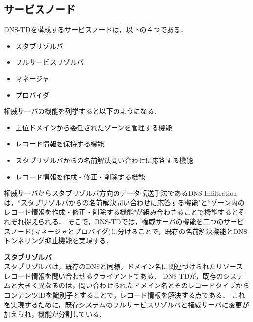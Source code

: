 \subsection{サービスノード}
DNS-TDを構成するサービスノードは，以下の４つである．
\begin{itemize}
 \item スタブリゾルバ
	\vspace{-3mm}
 \item フルサービスリゾルバ
	\vspace{-3mm}
 \item マネージャ
	\vspace{-3mm}
 \item プロバイダ
\end{itemize}

権威サーバの機能を列挙すると以下のようになる．
\begin{itemize}
 \item 上位ドメインから委任されたゾーンを管理する機能
	\vspace{-3mm}
 \item レコード情報を保持する機能
	\vspace{-3mm}
 \item スタブリゾルバからの名前解決問い合わせに応答する機能
	\vspace{-3mm}
 \item レコード情報を作成・修正・削除する機能
\end{itemize}
権威サーバからスタブリゾルバ方向のデータ転送手法であるDNS Infiltrationは，``スタブリゾルバからの名前解決問い合わせに応答する機能"と``ゾーン内のレコード情報を作成・修正・削除する機能"が組み合わさることで機能するとそれぞれ捉えられる．
そこで，DNS-TDでは，権威サーバの機能を二つのサービスノード(マネージャとプロバイダ)に分けることで，既存の名前解決機能とDNSトンネリング抑止機能を実現する．\newline

\hspace{-12pt}\textbf{スタブリゾルバ}\\
\hspace{12pt}スタブリゾルバは，既存のDNSと同様，ドメイン名に関連づけられたリソースレコード情報を問い合わせるクライアントである．
DNS-TDが，既存のシステムと大きく異なるのは，問い合わせられたドメイン名とそのレコードタイプからコンテンツIDを識別子とすることで，レコード情報を解決する点である．
これを実現するために，既存システムのフルサービスリゾルバと権威サーバに変更が加えられ，機能が分割している．\newline

